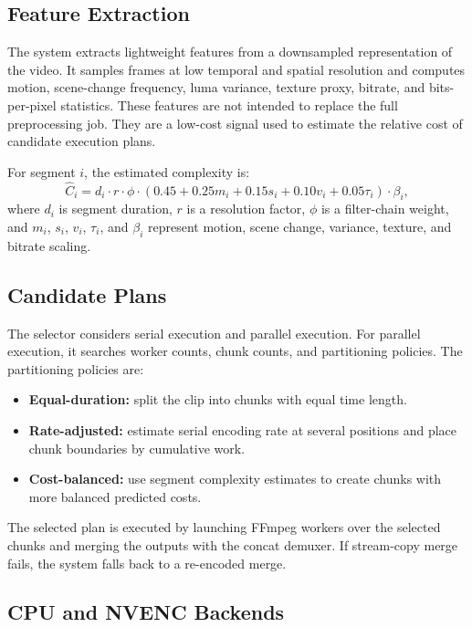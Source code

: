 \documentclass[conference]{IEEEtran}
\begin{document}
\subsection{Feature Extraction}

The system extracts lightweight features from a downsampled representation of the video.
It samples frames at low temporal and spatial resolution and computes motion, scene-change frequency, luma variance, texture proxy, bitrate, and bits-per-pixel statistics.
These features are not intended to replace the full preprocessing job.
They are a low-cost signal used to estimate the relative cost of candidate execution plans.

For segment $i$, the estimated complexity is:
\begin{equation}
\hat{C}_i = d_i \cdot r \cdot \phi \cdot
(0.45 + 0.25m_i + 0.15s_i + 0.10v_i + 0.05\tau_i) \cdot \beta_i,
\label{eq:complexity}
\end{equation}
where $d_i$ is segment duration, $r$ is a resolution factor, $\phi$ is a filter-chain weight, and $m_i$, $s_i$, $v_i$, $\tau_i$, and $\beta_i$ represent motion, scene change, variance, texture, and bitrate scaling.

\subsection{Candidate Plans}

The selector considers serial execution and parallel execution.
For parallel execution, it searches worker counts, chunk counts, and partitioning policies.
The partitioning policies are:
\begin{itemize}
\item \textbf{Equal-duration:} split the clip into chunks with equal time length.
\item \textbf{Rate-adjusted:} estimate serial encoding rate at several positions and place chunk boundaries by cumulative work.
\item \textbf{Cost-balanced:} use segment complexity estimates to create chunks with more balanced predicted costs.
\end{itemize}

The selected plan is executed by launching FFmpeg workers over the selected chunks and merging the outputs with the concat demuxer.
If stream-copy merge fails, the system falls back to a re-encoded merge.

\subsection{CPU and NVENC Backends}
\end{document}
